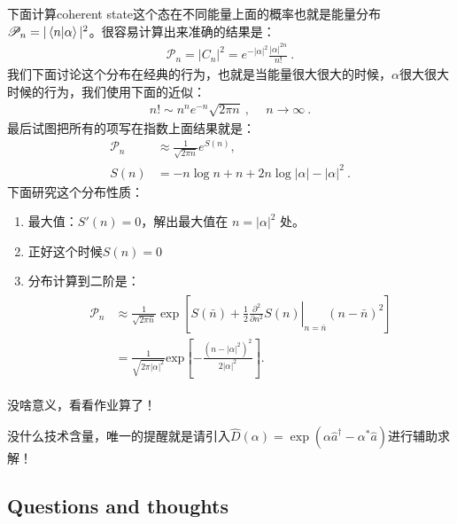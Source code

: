 下面计算coherent state这个态在不同能量上面的概率也就是能量分布 $ \mathscr{P}_n =
|\braket{n}{\alpha}|^2 $。很容易计算出来准确的结果是：
\begin{align}
  \mathscr{P}_n=|C_n|^2=e^{-|\alpha|^2}\frac{|\alpha|^{2n}}{n!}\mathrm{~.}
\end{align}
我们下面讨论这个分布在经典的行为，也就是当能量很大很大的时候，$ \alpha $很大很大时候的行为，我们使用下面的近似：
\begin{align}
  n!\sim n^ne^{-n}\sqrt{2\pi n}\mathrm{~,~}\quad n\to\infty\mathrm{~.}
\end{align}
最后试图把所有的项写在指数上面结果就是：
\begin{align}
  \mathscr{P}_n&\approx\frac{1}{\sqrt{2\pi n}}e^{S(n)},\\
  S(n)&=-n\log n+n+2n\log|\alpha|-|\alpha|^2\mathrm{~.}
\end{align}
下面研究这个分布性质：
\begin{enumerate}
  \item 最大值：$ S'(n)=0 $，解出最大值在 $ n=|\alpha|^2 $ 处。
  \item 正好这个时候$ S(n) = 0 $
  \item 分布计算到二阶是：
    \begin{align}
      \begin{aligned}\mathscr{P}_{n}&\approx\frac{1}{\sqrt{2\pi\bar{n}}}\exp\left[S(\bar{n})+\frac{1}{2}\left.\frac{\partial^2}{\partial
        n^2}S(n)\right|_{n=\bar{n}}(n-\bar{n})^2\right]\\&=\frac{1}{\sqrt{2\pi|\alpha|^2}}\mathrm{exp}\left[-\frac{\left(n-|\alpha|^2\right)^2}{2|\alpha|^2}\right].
      \end{aligned}
    \end{align}
\end{enumerate}


没啥意义，看看作业算了！

\bigskip
{}

没什么技术含量，唯一的提醒就是请引入$
\hat{D}(\alpha)=\exp\left(\alpha\hat{a}^\dagger-\alpha^*\hat{a}\right) $进行辅助求解！

\subsection{Questions and thoughts}

